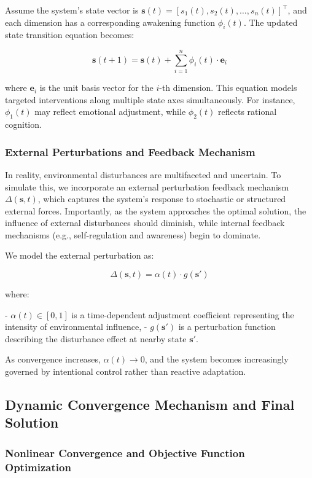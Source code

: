 \documentclass[12pt]{article}
\begin{document}
Assume the system’s state vector is \( \mathbf{s}(t) = [s_1(t), s_2(t), \dots, s_n(t)]^\top \), and each dimension has a corresponding awakening function \( \phi_i(t) \). The updated state transition equation becomes:

\[
\mathbf{s}(t+1) = \mathbf{s}(t) + \sum_{i=1}^{n} \phi_i(t) \cdot \mathbf{e}_i
\]

where \( \mathbf{e}_i \) is the unit basis vector for the \( i \)-th dimension. This equation models targeted interventions along multiple state axes simultaneously. For instance, \( \phi_1(t) \) may reflect emotional adjustment, while \( \phi_2(t) \) reflects rational cognition.

\subsubsection{External Perturbations and Feedback Mechanism}

In reality, environmental disturbances are multifaceted and uncertain. To simulate this, we incorporate an external perturbation feedback mechanism \( \Delta(\mathbf{s}, t) \), which captures the system’s response to stochastic or structured external forces. Importantly, as the system approaches the optimal solution, the influence of external disturbances should diminish, while internal feedback mechanisms (e.g., self-regulation and awareness) begin to dominate.

We model the external perturbation as:

\[
\Delta(\mathbf{s}, t) = \alpha(t) \cdot g(\mathbf{s}')
\]

where:

- \( \alpha(t) \in [0, 1] \) is a time-dependent adjustment coefficient representing the intensity of environmental influence,
- \( g(\mathbf{s}') \) is a perturbation function describing the disturbance effect at nearby state \( \mathbf{s}' \).

As convergence increases, \( \alpha(t) \to 0 \), and the system becomes increasingly governed by intentional control rather than reactive adaptation.
\subsection{Dynamic Convergence Mechanism and Final Solution}

\subsubsection{Nonlinear Convergence and Objective Function Optimization}
\end{document}
